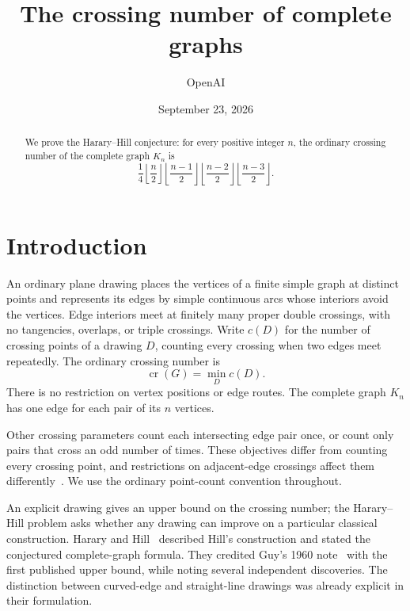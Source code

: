 \documentclass[11pt,a4paper]{article}
\theoremstyle{remark}
\numberwithin{equation}{section}
\newcommand{\crn}{\operatorname{cr}}
\begin{document}
\title{The crossing number of complete graphs}
\author{OpenAI}
\date{September 23, 2026}
\maketitle
\begin{abstract}
We prove the Harary--Hill conjecture: for every positive integer $n$,
the ordinary crossing number of the complete graph $K_n$ is
\[
 \frac14\left\lfloor\frac n2\right\rfloor
 \left\lfloor\frac{n-1}{2}\right\rfloor
 \left\lfloor\frac{n-2}{2}\right\rfloor
 \left\lfloor\frac{n-3}{2}\right\rfloor.
\]
\end{abstract}

\section{Introduction}

An ordinary plane drawing places the vertices of a finite simple graph
at distinct points and represents its edges by simple continuous arcs
whose interiors avoid the vertices. Edge interiors meet at finitely
many proper double crossings, with no tangencies, overlaps, or triple
crossings. Write \(c(D)\) for the number of crossing points of a drawing
\(D\), counting every crossing when two edges meet repeatedly. The
ordinary crossing number is
\[
\crn(G)=\min_D c(D).
\]
There is no restriction on vertex positions or edge routes.
The complete graph $K_n$ has one edge for each pair of its $n$ vertices.

Other crossing parameters count each intersecting edge pair once, or
count only pairs that cross an odd number of times. These objectives
differ from counting every crossing point, and restrictions on
adjacent-edge crossings affect them differently~\cite{PachToth2000,FulekEtAl2012}.
We use the ordinary point-count convention throughout.

An explicit drawing gives an upper bound on the crossing number; the
Harary--Hill problem asks whether any drawing can improve on a particular
classical construction. Harary and Hill~\cite[Section~3]{HararyHill1963}
described Hill's construction and stated the conjectured complete-graph
formula. They credited Guy's 1960 note~\cite{Guy1960} with the first
published upper bound, while noting several independent discoveries.
The distinction between curved-edge and straight-line drawings was
already explicit in their formulation.
\end{document}
